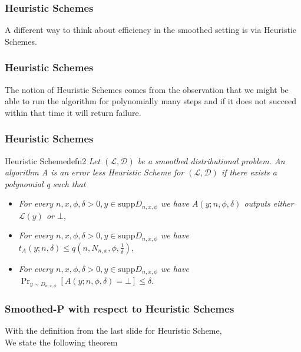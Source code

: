 \begin{frame}
    \frametitle{Heuristic Schemes}

    \begin{center}
        A different way to think about efficiency in the smoothed setting is via Heuristic Schemes.
    \end{center}
\end{frame}

\begin{frame}
    \frametitle{Heuristic Schemes}

    \begin{center}
        The notion of Heuristic Schemes comes from the observation that we might be able to run the algorithm for
        polynomially many steps and if it does not succeed within that time it will return failure.
    \end{center}
\end{frame}

\begin{frame}
    \frametitle{Heuristic Schemes}

    \begin{define}{Heuristic Scheme}{defn2}
        \textit{Let $(\mathcal{L}, \mathcal{D})$ be a smoothed distributional problem. An algorithm A is an error less Heuristic Scheme for
            $(\mathcal{L}, \mathcal{D})$ if there exists a polynomial q such that}
        \begin{itemize}
            \item \textit{For every $n, x, \phi, \delta > 0, y \in \text{supp}D_{n, x, \phi}$ we have $A(y; n, \phi, \delta)$ outputs either $\mathcal{L}(y)$ or $\bot$},
            \item \textit{For every $n, x, \phi, \delta > 0, y \in \text{supp}D_{n, x, \phi}$ we have $t_A(y; n, \delta) \leq q(n, N_{n,x},\phi, \frac{1}{\delta})$},
            \item \textit{For every $n, x, \phi, \delta > 0, y \in \text{supp}D_{n, x, \phi}$ we have $\Pr_{y \sim D_{n, x, \phi}}[A(y; n, \phi, \delta) = \bot] \leq \delta$}.
        \end{itemize}
    \end{define}

\end{frame}

\begin{frame}
    \frametitle{\textsf{Smoothed-P} with respect to Heuristic Schemes}

    \begin{center}
        With the definition from the last slide for Heuristic Scheme,\\We state the following theorem
    \end{center}

\end{frame}

